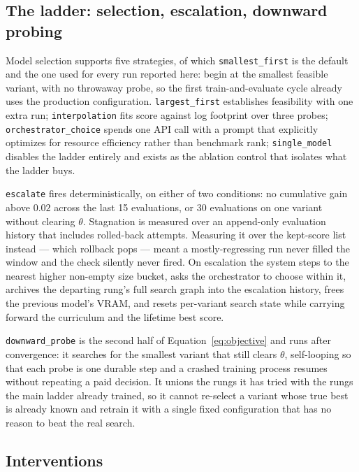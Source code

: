 \documentclass[sigconf,10pt]{acmart}
\begin{document}
\subsection{The ladder: selection, escalation, downward probing}
\label{sec:system-ladder}

Model selection supports five strategies, of which \texttt{smallest\_first} is the default
and the one used for every run reported here: begin at the smallest feasible variant, with no
throwaway probe, so the first train-and-evaluate cycle already uses the production
configuration. \texttt{largest\_first} establishes feasibility with one extra run;
\texttt{interpolation} fits score against log footprint over three probes;
\texttt{orchestrator\_choice} spends one API call with a prompt that explicitly optimizes for
resource efficiency rather than benchmark rank; \texttt{single\_model} disables the ladder
entirely and exists as the ablation control that isolates what the ladder buys.

\texttt{escalate} fires deterministically, on either of two conditions: no cumulative gain
above $0.02$ across the last 15 evaluations, or 30 evaluations on one variant without
clearing $\theta$. Stagnation is measured over an append-only evaluation history that
includes rolled-back attempts. Measuring it over the kept-score list instead --- which
rollback pops --- meant a mostly-regressing run never filled the window and the check
silently never fired. On escalation the system steps to the nearest higher non-empty size
bucket, asks the orchestrator to choose within it, archives the departing rung's full search
graph into the escalation history, frees the previous model's VRAM, and resets per-variant
search state while carrying forward the curriculum and the lifetime best score.

\texttt{downward\_probe} is the second half of Equation~\ref{eq:objective} and runs after
convergence: it searches for the smallest variant that still clears $\theta$, self-looping so
that each probe is one durable step and a crashed training process resumes without repeating
a paid decision. It unions the rungs it has tried with the rungs the main ladder already
trained, so it cannot re-select a variant whose true best is already known and retrain it with
a single fixed configuration that has no reason to beat the real search.

\subsection{Interventions}
\label{sec:system-interventions}
\end{document}
